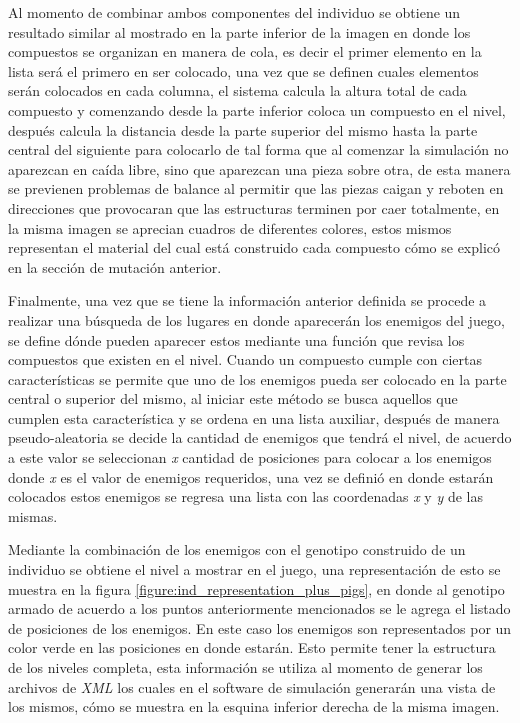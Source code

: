 Al momento de combinar ambos componentes del individuo se obtiene un resultado
similar al mostrado en la parte inferior de la imagen en donde los compuestos se
organizan en manera de cola, es decir el primer elemento en la lista será el
primero en ser colocado, una vez que se definen cuales elementos serán colocados
en cada columna, el sistema calcula la altura total de cada compuesto y
comenzando desde la parte inferior coloca un compuesto en el nivel, después
calcula la distancia desde la parte superior del mismo hasta la parte central
del siguiente para colocarlo de tal forma que al comenzar la simulación no
aparezcan en caída libre, sino que aparezcan una pieza sobre otra, de esta manera
se previenen problemas de balance al permitir que las piezas caigan y
reboten en direcciones que provocaran que las estructuras terminen por caer
totalmente, en la misma imagen se aprecian cuadros de diferentes colores, estos
mismos representan el material del cual está construido cada compuesto cómo se
explicó en la sección de mutación anterior.

Finalmente, una vez que se tiene la información anterior definida se procede a
realizar una búsqueda de los lugares en donde aparecerán los enemigos del juego,
se define dónde pueden aparecer estos mediante una función
que revisa los compuestos que existen en el nivel. Cuando un compuesto cumple
con ciertas características se permite que uno de los enemigos pueda ser
colocado en la parte central o superior del mismo, al iniciar este método se
busca aquellos que cumplen esta característica y se ordena en una lista
auxiliar, después de manera pseudo-aleatoria se decide la cantidad de enemigos
que tendrá el nivel, de acuerdo a este valor se seleccionan \textit{x} cantidad
de posiciones para colocar a los enemigos donde \textit{x} es el valor de
enemigos requeridos, una vez se definió en donde estarán colocados estos
enemigos se regresa una lista con las coordenadas \textit{x} y \textit{y} de las
mismas.

Mediante la combinación de los enemigos con el genotipo construido de un
individuo se obtiene el nivel a mostrar en el juego, una representación de esto
se muestra en la figura \ref{figure:ind_representation_plus_pigs}, en donde al
genotipo armado de acuerdo a los puntos anteriormente mencionados se le agrega el
listado de posiciones de los enemigos. En este caso los enemigos son
representados por un color verde en las posiciones en donde estarán. 
Esto permite tener la estructura de los niveles completa, esta información se
utiliza al momento de generar los archivos de \textit{XML} los cuales en el
software de simulación generarán una vista de los mismos, cómo se muestra en la
esquina inferior derecha de la misma imagen. 

